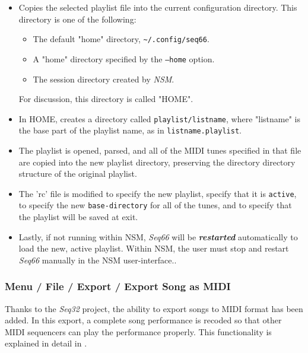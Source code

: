    \begin{itemize}
      \item Copies the selected playlist file into the current configuration
         directory.  This directory is one of the following:
         \begin{itemize}
            \item The default "home" directory,
               \texttt{\textasciitilde/.config/seq66}.
            \item A "home" directory specified by the \texttt{--home} option.
            \item The session directory created by \textsl{NSM}.
         \end{itemize}
         For discussion, this directory is called "HOME".
      \item In HOME, creates a directory called \texttt{playlist/listname},
         where "listname" is the base part of the playlist name, as in
         \texttt{listname.playlist}.
      \item The playlist is opened, parsed, and all of the MIDI tunes specified
         in that file are copied into the new playlist directory, preserving
         the directory directory structure of the original playlist.
      \item The 'rc' file is modified to specify the new playlist,
         specify that it is \texttt{active},
         to specify the new \texttt{base-directory} for all of the tunes,
         and to specify that the playlist will be saved at exit.
      \item Lastly, if not running within NSM, \textsl{Seq66} will be
         \textsl{\textbf{restarted}} automatically to load the new,
         active playlist.
         Within NSM, the user must stop and restart \textsl{Seq66}
         manually in the NSM user-interface..
   \end{itemize}

\subsubsection{Menu / File / Export / Export Song as MIDI}
\label{subsubsec:menu_file_export}

   Thanks to the \textsl{Seq32} project, the ability to export songs to MIDI
   format has been added.  In this export, a complete song performance is
   recoded so that other MIDI sequencers can play the performance properly.
   This functionality is explained in detail in
   .


